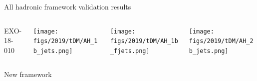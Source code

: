 \documentclass[9pt]{beamer}
\begin{document}
\begin{frame}{\alert{All hadronic} framework validation results}
\justifying
\begin{columns}
		\hspace{5pt}
		\begin{column}{0.05\textwidth}
			\begin{block}{ {EXO-18-010}}\end{block}		
		\end{column} \hfill
		\begin{column}{0.32\textwidth}
			\begin{center}
     			\texttt{[image: figs/2019/tDM/AH\_1b\_jets.png]}
    		\end{center}		
		\end{column} \hfill
		\begin{column}{0.32\textwidth}
			\begin{center}
     			\texttt{[image: figs/2019/tDM/AH\_1b\_fjets.png]}
    		\end{center}		
		\end{column} \hfill
		\begin{column}{0.32\textwidth}
			\begin{center}
     			\texttt{[image: figs/2019/tDM/AH\_2b\_jets.png]}
   			 \end{center}
		\end{column} \hfill
	\end{columns} \vspace{-5pt}
	\begin{columns}
		\hspace{5pt}
		\begin{column}{0.05\textwidth}
			\begin{block}{ {New framework}}\end{block}	

\end{column}
\end{columns}
\end{frame}
\end{document}
